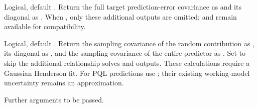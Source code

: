 \documentclass[a4paper]{book}
\begin{document}
\begin{Arguments}
\begin{ldescription}
\item[\code{PEV}] Logical, default . Return the full target prediction-error
covariance as  and its diagonal as . When
, only these additional outputs are omitted;  and
 remain available for compatibility.
\item[\code{VarU}] Logical, default . Return the sampling covariance of
the random contribution as , its diagonal as ,
and the sampling covariance of the entire predictor as .
Set  to skip the additional relationship solves and outputs.
These calculations require a Gaussian Henderson fit. For PQL predictions
use ; their existing working-model uncertainty remains an
approximation.
\item[\code{...}] Further arguments to be passed.
\end{ldescription}
\end{Arguments}
%
\end{document}
